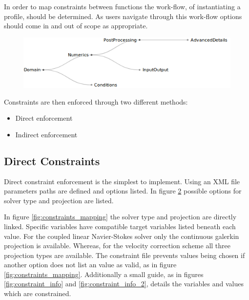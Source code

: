 \documentclass[11pt, a4paper]{report}
\begin{document}
In order to map constraints between functions the work-flow, of instantiating a profile, should be determined. As users navigate through this work-flow options should come in and out of scope as appropriate.

\begin{figure}[htb!]
 \centering
 \includegraphics[width=.85\linewidth,  clip=true, trim = 0cm 0cm 0cm 0cm]{workflow}
 \label{fig:descision_flow}
\end{figure}

\noindent
Constraints are then enforced through two different methods:
\begin{itemize}
\item Direct enforcement
\item Indirect enforcement
\end{itemize}

\subsection{Direct Constraints}
Direct constraint enforcement is the simplest to implement. Using an XML file parameters paths are defined and options listed. 
In figure \ref{fig:constraints_variables} possible options for solver type and projection are listed.

\begin{figure}[htb!]
 \centering
 
 \label{fig:constraints_variables}
\end{figure}

In figure \ref{fig:constraints_mapping} the solver type and projection are directly linked. Specific variables have compatible target variables listed beneath each value. For the coupled linear Navier-Stokes solver only the continuous galerkin projection is available. Whereas, for the velocity correction scheme all three projection types are available. The constraint file prevents values being chosen if another option does not list an value as valid, as in figure \ref{fig:constraints_mapping}. Additionally a small guide, as in figures \ref{fig:constraint_info} and \ref{fig:constraint_info_2}, details the variables and values which are constrained.
\end{document}
